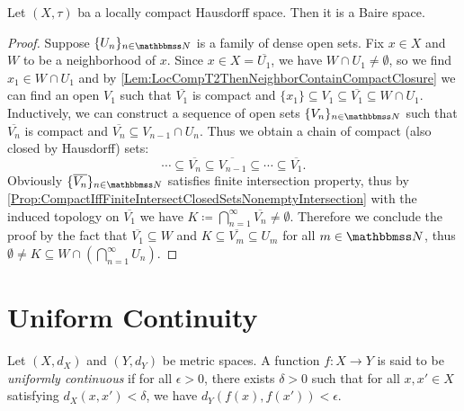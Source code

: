 \documentclass[screen,single]{techreport}
\numberwithin{equation}{section}
\begin{document}
\begin{theorem}\label{The:LocallyCompactT2ImplyBaire}
  Let $(X,\tau)$ ba a locally compact Hausdorff space.
  Then it is a Baire space.
\end{theorem}
\begin{proof}
  Suppose $\{U_n\}_{n \in \bbN}$ is a family of dense open sets.
  Fix $x \in X$ and $W$ to be a neighborhood of $x$.
  Since $x \in X = \overline{U_1}$, we have $W \cap U_1 \neq \emptyset$, so we find $x_1 \in W \cap U_1$ and by \cref{Lem:LocCompT2ThenNeighborContainCompactClosure} we can find an open $V_1$ such that $\overline{V_1}$ is compact and $\{x_1\} \subseteq V_1 \subseteq \overline{V_1} \subseteq W \cap U_1$.
  Inductively, we can construct a sequence of open sets $\{V_n\}_{n \in \bbN}$ such that $\overline{V_n}$ is compact and $\overline{V_n} \subseteq V_{n-1} \cap U_n$.
  Thus we obtain a chain of compact (also closed by Hausdorff) sets:
  \[
  \cdots \subseteq \overline{V_n} \subseteq \overline{V_{n-1}} \subseteq \cdots \subseteq \overline{V_1}.
  \]
  Obviously $\{\overline{V_n}\}_{n \in \bbN}$ satisfies finite intersection property, thus by \cref{Prop:CompactIffFiniteIntersectClosedSetsNonemptyIntersection} with the induced topology on $\overline{V_1}$ we have $K \coloneqq \bigcap_{n=1}^\infty \overline{V_n} \neq \emptyset$.
  Therefore we conclude the proof by the fact that $\overline{V_1} \subseteq W$ and $K \subseteq \overline{V_m} \subseteq U_m$ for all $m \in \bbN$, thus $\emptyset \neq K \subseteq W \cap (\bigcap_{n=1}^\infty U_n)$.
\end{proof}

\section{Uniform Continuity}

\begin{definition}\label{De:UniformContinuity}
  Let $(X,d_X)$ and $(Y,d_Y)$ be metric spaces.
  A function $f : X \to Y$ is said to be \emph{uniformly continuous} if for all $\epsilon > 0$, there exists $\delta >0$ such that for all $x,x' \in X$ satisfying $d_X(x,x') < \delta$, we have $d_Y(f(x),f(x')) < \epsilon$.
\end{definition}
\end{document}
